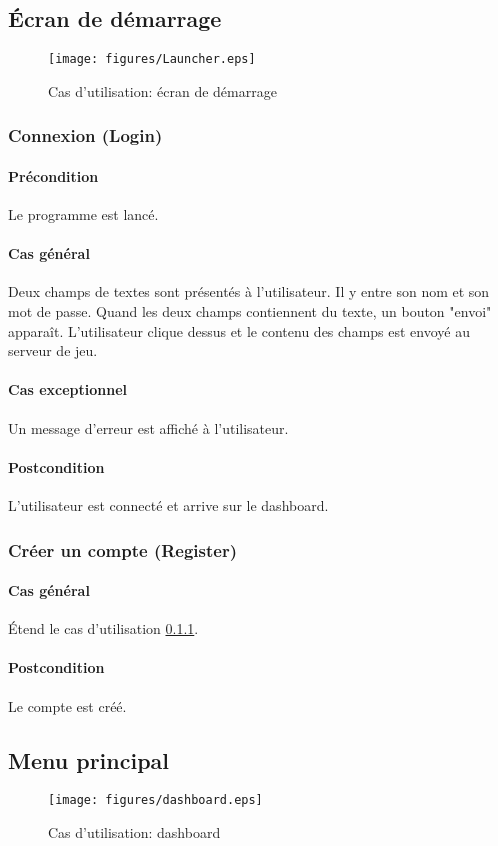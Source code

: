 \subsection{\'Ecran de démarrage}
\begin{figure}[h!]
    \centering
    \texttt{[image: figures/Launcher.eps]}
    \caption{\label{fig:UC:launcher} Cas d'utilisation: écran de démarrage}
\end{figure}

\subsubsection{Connexion (Login)}
    \label{UC:login}
    \paragraph{Précondition} Le programme est lancé.
    \paragraph{Cas général} Deux champs de textes sont présentés à l'\gls{utilisateur}. Il y entre son nom et son mot de passe. Quand les deux champs contiennent du texte, un bouton "envoi" apparaît. L'utilisateur clique dessus et le contenu des champs est envoyé au serveur de jeu.
    \paragraph{Cas exceptionnel} Un message d'erreur est affiché à l'utilisateur.
    \paragraph{Postcondition} L'utilisateur est connecté et arrive sur le dashboard.

\subsubsection{Créer un compte (Register)}
    \paragraph{Cas général} \'Etend le cas d'utilisation \ref{UC:login}.
    \paragraph{Postcondition} Le compte est créé.

\subsection{Menu principal}
\begin{figure}[h!]
    \centering
    \texttt{[image: figures/dashboard.eps]}
    \caption{\label{fig:UC:dashboard} Cas d'utilisation: dashboard}
\end{figure}

